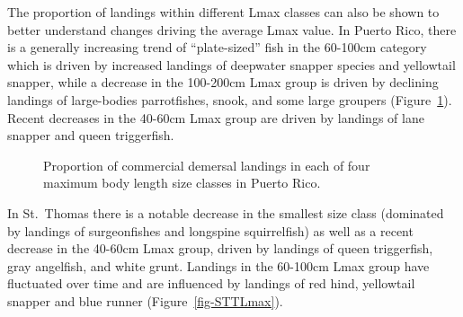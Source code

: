 \documentclass[
  letterpaper,
  oneside,
  open=any]{scrbook}
\begin{document}
The proportion of landings within different Lmax classes can also be
shown to better understand changes driving the average Lmax value. In
Puerto Rico, there is a generally increasing trend of ``plate-sized''
fish in the 60-100cm category which is driven by increased landings of
deepwater snapper species and yellowtail snapper, while a decrease in
the 100-200cm Lmax group is driven by declining landings of large-bodies
parrotfishes, snook, and some large groupers (Figure~\ref{fig-PRLmax}).
Recent decreases in the 40-60cm Lmax group are driven by landings of
lane snapper and queen triggerfish.

\begin{figure}


\caption{\label{fig-PRLmax}Proportion of commercial demersal landings in
each of four maximum body length size classes in Puerto Rico.}

\end{figure}%

In St.~Thomas there is a notable decrease in the smallest size class
(dominated by landings of surgeonfishes and longspine squirrelfish) as
well as a recent decrease in the 40-60cm Lmax group, driven by landings
of queen triggerfish, gray angelfish, and white grunt. Landings in the
60-100cm Lmax group have fluctuated over time and are influenced by
landings of red hind, yellowtail snapper and blue runner
(Figure~\ref{fig-STTLmax}).
\end{document}

